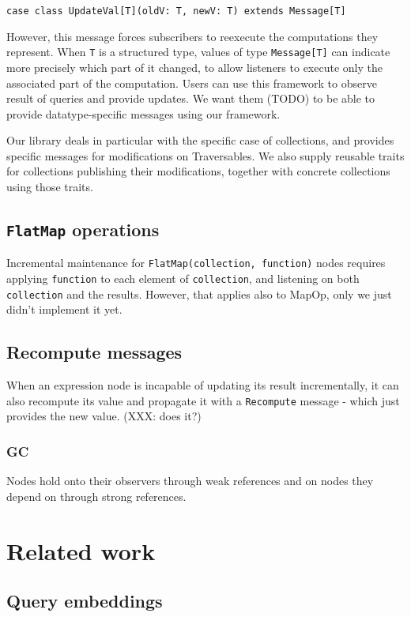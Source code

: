 \documentclass[preprint,authoryear,10pt]{sigplanconf}
\begin{document}
\texttt{case class UpdateVal{[}T{]}(oldV: T, newV: T) extends Message{[}T{]}}

However, this message forces subscribers to reexecute the computations
they represent. When \texttt{T} is a structured type, values of type
\texttt{Message{[}T{]}} can indicate more precisely which part of it
changed, to allow listeners to execute only the associated part of the
computation. Users can use this framework to observe result of queries
and provide updates. We want them (TODO) to be able to provide
datatype-specific messages using our framework.

Our library deals in particular with the specific case of collections,
and provides specific messages for modifications on Traversables. We
also supply reusable traits for collections publishing their
modifications, together with concrete collections using those traits.

\subsection{\texttt{FlatMap} operations}

Incremental maintenance for \texttt{FlatMap(collection, function)} nodes
requires applying \texttt{function} to each element of
\texttt{collection}, and listening on both \texttt{collection} and the
results. However, that applies also to MapOp, only we just didn't
implement it yet.

\subsection{Recompute messages}

When an expression node is incapable of updating its result
incrementally, it can also recompute its value and propagate it with a
\texttt{Recompute} message - which just provides the new value. (XXX:
does it?)

\subsubsection{GC}

Nodes hold onto their observers through weak references and on nodes
they depend on through strong references.

\section{Related work}

\subsection{Query embeddings}
\end{document}
